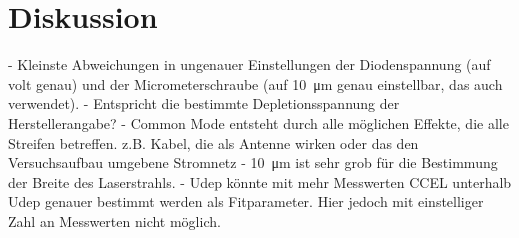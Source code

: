 \section{Diskussion}
\label{sec:Diskussion}

- Kleinste Abweichungen in ungenauer Einstellungen der Diodenspannung (auf volt genau)
und der Micrometerschraube (auf \SI{10}{\micro\meter} genau einstellbar, das auch
verwendet).
- Entspricht die bestimmte Depletionsspannung der Herstellerangabe?
- Common Mode entsteht durch alle möglichen Effekte, die alle Streifen betreffen.
z.B. Kabel, die als Antenne wirken oder das den Versuchsaufbau umgebene Stromnetz
- \SI{10}{\micro\meter} ist sehr grob für die Bestimmung der Breite des Laserstrahls.
- Udep könnte mit mehr Messwerten CCEL unterhalb Udep genauer bestimmt werden als
Fitparameter. Hier jedoch mit einstelliger Zahl an Messwerten nicht möglich.
